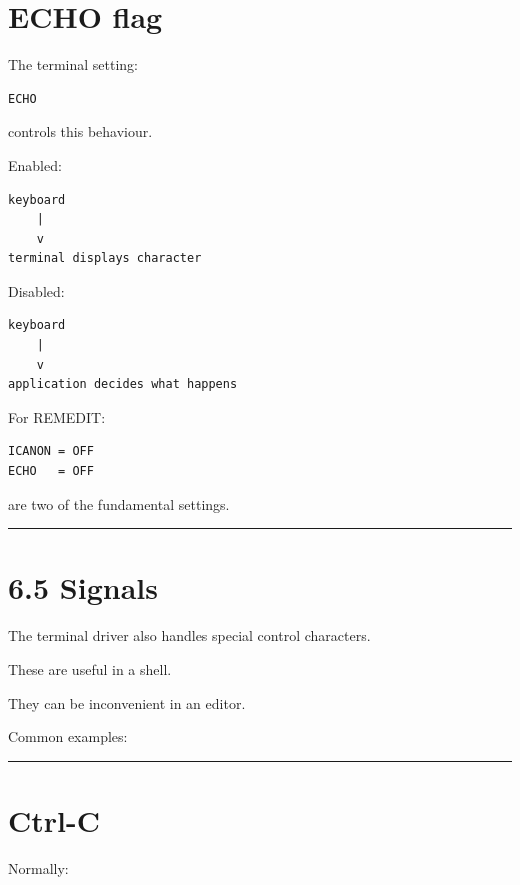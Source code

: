 \documentclass[
  oneside,
  openany]{book}
\begin{document}
\hypertarget{echo-flag}{%
\section{ECHO flag}\label{echo-flag}}

The terminal setting:

\begin{verbatim}
ECHO
\end{verbatim}

controls this behaviour.

Enabled:

\begin{verbatim}
keyboard
    |
    v
terminal displays character
\end{verbatim}

Disabled:

\begin{verbatim}
keyboard
    |
    v
application decides what happens
\end{verbatim}

For REMEDIT:

\begin{verbatim}
ICANON = OFF
ECHO   = OFF
\end{verbatim}

are two of the fundamental settings.

\begin{center}\rule{0.5\linewidth}{0.5pt}\end{center}

\hypertarget{signals}{%
\section{6.5 Signals}\label{signals}}

The terminal driver also handles special control characters.

These are useful in a shell.

They can be inconvenient in an editor.

Common examples:

\begin{center}\rule{0.5\linewidth}{0.5pt}\end{center}

\hypertarget{ctrl-c}{%
\section{Ctrl-C}\label{ctrl-c}}

Normally:
\end{document}
